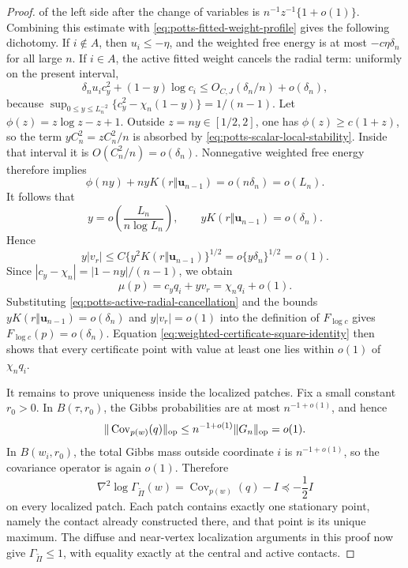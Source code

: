 \begin{proof}
of the left side after the change of variables is
\(n^{-1}z^{-1}\{1+o(1)\}\).
Combining this estimate with \eqref{eq:potts-fitted-weight-profile} gives
the following dichotomy.  If \(i\notin A\), then \(u_i\le-\eta\), and the
weighted free energy is at most \(-c\eta\delta_n\) for all large \(n\).
If \(i\in A\), the active fitted weight cancels the radial term: uniformly
on the present interval,
\begin{equation}
\label{eq:potts-active-radial-cancellation}
 \delta_nu_i c_y^2+(1-y)\log c_i
 \le O_{C,J}(\delta_n/n)+o(\delta_n),
\end{equation}
because
\(\sup_{0\le y\le L_n^{-2}}\{c_y^2-\chi_n(1-y)\}
=1/(n-1)\).
Let \(\phi(z)=z\log z-z+1\).  Outside \(z=ny\in[1/2,2]\), one has
\(\phi(z)\ge c(1+z)\), so the term \(yC_n^2=zC_n^2/n\) is absorbed by
\eqref{eq:potts-scalar-local-stability}.  Inside that interval it is
\(O(C_n^2/n)=o(\delta_n)\).  Nonnegative weighted free energy therefore
implies
\[
 \phi(ny)+nyK(r\Vert\mathbf u_{n-1})=o(n\delta_n)=o(L_n).
\]
It follows that
\[
 y=o\left(\frac{L_n}{n\log L_n}\right),
 \qquad
 yK(r\Vert\mathbf u_{n-1})=o(\delta_n).
\]
Hence
\[
 y|v_r|
 \le C\{y^2K(r\Vert\mathbf u_{n-1})\}^{1/2}
 =o\{y\delta_n\}^{1/2}=o(1).
\]
Since
\(|c_y-\chi_n|=|1-ny|/(n-1)\), we obtain
\[
 \mu(p)=c_yq_i+yv_r=\chi_nq_i+o(1).
\]
Substituting \eqref{eq:potts-active-radial-cancellation} and the bounds
\(yK(r\Vert\mathbf u_{n-1})=o(\delta_n)\) and
\(y|v_r|=o(1)\) into the definition of \(F_{\log c}\) gives
\(F_{\log c}(p)=o(\delta_n)\).  Equation
\eqref{eq:weighted-certificate-square-identity} then shows that every
certificate point with value at least one lies within \(o(1)\) of
\(\chi_nq_i\).

It remains to prove uniqueness inside the localized patches.  Fix a small
constant \(r_0>0\).  In \(B(\tau,r_0)\), the Gibbs probabilities are at
most \(n^{-1+o(1)}\), and hence
\[
 \|\operatorname{Cov}_{p(w)}(q)\|_{\rm op}
 \le n^{-1+o(1)}\|G_n\|_{\rm op}=o(1).
\]
In \(B(w_i,r_0)\), the total Gibbs mass outside coordinate \(i\) is
\(n^{-1+o(1)}\), so the covariance operator is again \(o(1)\).  Therefore
\[
 \nabla^2\log\Gamma_{\widetilde\Pi}(w)
 =\operatorname{Cov}_{p(w)}(q)-I\preceq-\frac12I
\]
on every localized patch.  Each patch contains exactly one stationary
point, namely the contact already constructed there, and that point is its
unique maximum.  The diffuse and near-vertex localization arguments in this
proof now give
\(\Gamma_{\widetilde\Pi}\le1\), with equality exactly at the central and
active contacts.


\end{proof}
